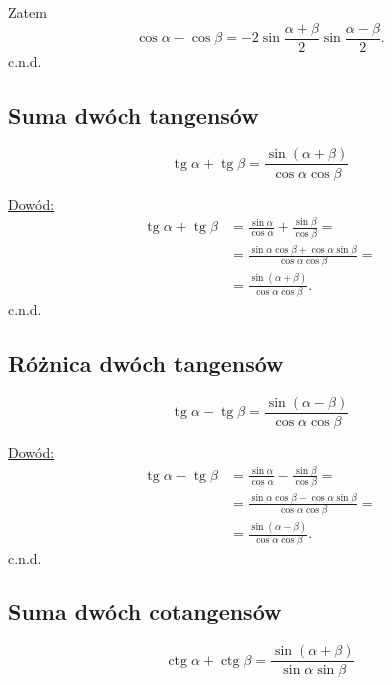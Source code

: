 \documentclass[12pt,a4paper,fleqn]{article}
\DeclareMathOperator{\tg}{tg}
\DeclareMathOperator{\ctg}{ctg}
\begin{document}
		Zatem
		\begin{equation*}
			\cos\alpha - \cos \beta =-2\sin\frac{\alpha+\beta}{2}\sin\frac{\alpha-\beta}{2}.
		\end{equation*}
	c.n.d.

	\subsection{Suma dwóch tangensów}
		\begin{equation*}
		\tg\alpha + \tg\beta = \frac{\sin(\alpha+\beta)}{\cos\alpha\cos\beta}
		\end{equation*}
		
		\underline{Dowód:} \noindent
		\begin{align*}
			\tg\alpha + \tg\beta &= \frac{\sin\alpha}{\cos\alpha} + \frac{\sin\beta}{\cos\beta} = \\
			                  	 &= \frac{\sin\alpha\cos\beta + \cos\alpha\sin\beta}{\cos\alpha\cos\beta} =\\
			                  	 &=\frac{\sin(\alpha+\beta)}{\cos\alpha\cos\beta}.
		\end{align*}
		c.n.d.
	\subsection{Różnica dwóch tangensów}
		\begin{equation*}
		\tg\alpha - \tg\beta = \frac{\sin(\alpha-\beta)}{\cos\alpha\cos\beta}
		\end{equation*}
		
		\underline{Dowód:} \noindent
		\begin{align*}
			\tg\alpha - \tg\beta &= \frac{\sin\alpha}{\cos\alpha} - \frac{\sin\beta}{\cos\beta} = \\
			                  	 &= \frac{\sin\alpha\cos\beta - \cos\alpha\sin\beta}{\cos\alpha\cos\beta} =\\
			                  	 &=\frac{\sin(\alpha-\beta)}{\cos\alpha\cos\beta}.
		\end{align*}
		c.n.d.
		
	\subsection{Suma dwóch cotangensów}
		\begin{equation*}
			\ctg\alpha + \ctg\beta = \frac{\sin(\alpha+\beta)}{\sin\alpha\sin\beta}
		\end{equation*}
		
\end{document}
